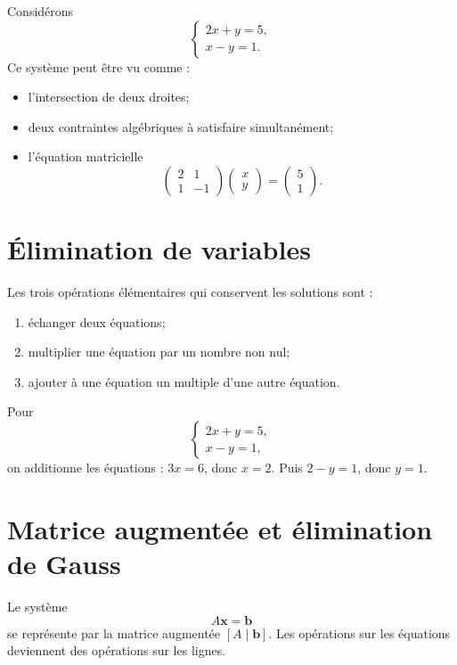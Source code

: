 \documentclass[12pt,a4paper,openany]{book}
\begin{document}
Considérons
\[
\begin{cases}
2x+y=5,\\
x-y=1.
\end{cases}
\]
Ce système peut être vu comme :
\begin{itemize}
\item l'intersection de deux droites;
\item deux contraintes algébriques à satisfaire simultanément;
\item l'équation matricielle
\[
\begin{pmatrix}2&1\\1&-1\end{pmatrix}
\begin{pmatrix}x\\y\end{pmatrix}
=
\begin{pmatrix}5\\1\end{pmatrix}.
\]
\end{itemize}

\section{Élimination de variables}

\begin{methodbox}
Les trois opérations élémentaires qui conservent les solutions sont :
\begin{enumerate}
\item échanger deux équations;
\item multiplier une équation par un nombre non nul;
\item ajouter à une équation un multiple d'une autre équation.
\end{enumerate}
\end{methodbox}

\begin{examplebox}
Pour
\[
\begin{cases}
2x+y=5,\\
x-y=1,
\end{cases}
\]
on additionne les équations : $3x=6$, donc $x=2$. Puis $2-y=1$, donc $y=1$.
\end{examplebox}

\section{Matrice augmentée et élimination de Gauss}

Le système
\[
A\mathbf x=\mathbf b
\]
se représente par la matrice augmentée $[A\mid\mathbf b]$. Les opérations sur les équations deviennent des opérations sur les lignes.
\end{document}
